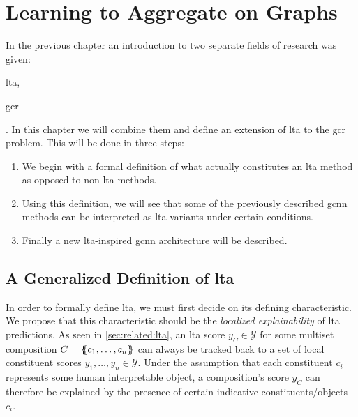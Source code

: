 \chapter{Learning to Aggregate on Graphs}%
\label{sec:ltag}

In the previous chapter an introduction to two separate fields of research was given:
\begin{enumerate*}
	\item \Acf{lta},
	\item \Acf{gcr}
\end{enumerate*}.
In this chapter we will combine them and define an extension of \ac{lta} to the \ac{gcr} problem.
This will be done in three steps:
\begin{enumerate}
	\item We begin with a formal definition of what actually constitutes an \ac{lta} method as opposed to non-\acs{lta} methods.
	\item Using this definition, we will see that some of the previously described \ac{gcnn} methods can be interpreted as \ac{lta} variants under certain conditions.
	\item Finally a new \acs{lta}-inspired \ac{gcnn} architecture will be described.
\end{enumerate}

\section{A Generalized Definition of \acs*{lta}}%
\label{sec:ltag:definition}

In order to formally define \ac{lta}, we must first decide on its defining characteristic.
We propose that this characteristic should be the \textit{localized explainability} of \ac{lta} predictions.
As seen in \cref{sec:related:lta}, an \ac{lta} score $y_{C} \in \mathcal{Y}$ for some multiset composition $C = \ldblbrace c_1, \dots, c_n \rdblbrace$ can always be tracked back to a set of local constituent scores $y_1, \dots, y_n \in \mathcal{Y}$.
Under the assumption that each constituent $c_i$ represents some human interpretable object, a composition's score $y_{C}$ can therefore be explained by the presence of certain indicative constituents/objects $c_i$.

